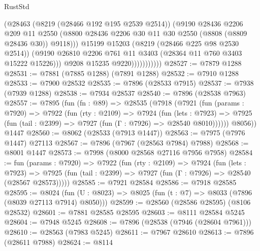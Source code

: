 \begin{lexlean}{RustStd}
\begin{coremodule}
                            (@28463
                              (@8219 (@28466 @192 @195 @2539 @2514))
                              (@9190
                                @28436
                                @2206
                                @209
                                @11
                                @2550
                                (@8800
                                  @28436
                                  @2206
                                  @30
                                  @11
                                  @30
                                  @2550
                                  (@8808 (@8809 @28436 @30))
                                  @9118)))
                            @15199
                            @15203
                            (@8219 (@28466 @225 @98 @2530 @2514))
                            (@9190
                              @26810
                              @2206
                              @761
                              @11
                              @3403
                              (@28364 @11 @760 @3403 @15222 @15226)))
                          @9208
                          @15235
                          @9220)))))))))))
@28527 := @7879 @1288
@28531 := @7881 (@7885 @1288) (@7891 @1288)
@28532 := @7910 @1288
@28533 := @7900 @28532
@28535 := @7896 (@28533 @7915)
@28537 := @7938 (@7939 @1288)
@28538 := @7934 @28537
@28540 := @7896 (@28538 @7963)
@28557 := @7895
    (fun (fn : @89) =>
    @28535
      (@7918
        (@7921
          (fun (params : @7920) =>
          @7922
            (fun (rty : @2109) =>
            @7924
              (fun (lets : @7923) =>
              @7925 (fun (tail : @2399) => @7927 (fun (Γ : @7926) => @28540 @8010))))))
        @8056))
    @1447
@28560 := @8062 (@28533 (@7913 @1447))
@28563 := @7975 (@7976 @1447) @27113
@28567 := @7896 (@7967 (@28563 @7984) @7988)
@28568 := @8001 @1447
@28573 := @7998 (@8000 @28568 @27116 @7956 @7958)
@28584 := fun (params : @7920) =>
  @7922
    (fun (rty : @2109) =>
    @7924
      (fun (lets : @7923) =>
      @7925 (fun (tail : @2399) => @7927 (fun (Γ : @7926) => @28540 (@28567 @28573)))))
@28585 := @7921 @28584
@28586 := @7918 @28585
@28595 := @8024
    (fun (U : @8023) => @8025 (fun (t : @7) => @8033 (@7896 (@8039 @27113 @7914) @8050)))
@28599 := @28560 (@28586 @28595) (@8106 @28532)
@28601 := @7881 @28585 @28595
@28603 := @8111 @28584 @5245
@28604 := @7948 @5245
@28608 := @7896 (@28538 (@7946 (@28604 @7961)))
@28610 := @28563 (@7983 @5245)
@28611 := @7967 @28610
@28613 := @7896 (@28611 @7988)
@28624 := @8114

\end{coremodule}
\end{lexlean}
